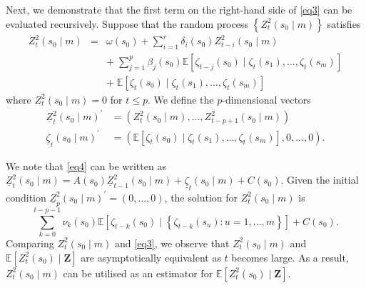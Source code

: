 \documentclass[fleqn,11pt]{article}
\begin{document}
Next, we demonstrate that the first term on the right-hand side of \eqref{eq3} can be evaluated recursively. Suppose that the random process $\left\{Z_t^2\left(s_0 \mid m\right)\right\}$ satisfies
\begin{eqnarray}\label{eq4}
Z_t^2\left(s_0 \mid m\right) & = & \omega(s_0) + \sum_{i=1}^r \delta_i(s_0) Z_{t-i}^2(s_0 \mid m) \\
&& + \; \sum_{j=1}^p \beta_j(s_0) \mathbb{E}\left[\zeta_{t-j} \left(s_0\right) \mid \zeta_t\left(s_1\right), \ldots, \zeta_t\left(s_m\right)\right] \nonumber   \\
&& + \; \mathbb{E}\left[\zeta_t\left(s_0\right) \mid \zeta_t\left(s_1\right), \ldots, \zeta_t\left(s_m\right)\right] \nonumber  
\end{eqnarray}
where $Z_t^2\left(s_0 \mid m\right)=0$ for $t \leq p$. We define the $p$-dimensional vectors
$$
\begin{aligned}
\underline{Z}_t^2\left(s_0 \mid m\right)^{\prime} & =\left(Z_t^2\left(s_0 \mid m\right), \ldots, Z_{t-p+1}^2\left(s_0 \mid m\right)\right) \\
\underline{\zeta}_t\left(s_0 \mid m\right)^{\prime} & =\left( \mathbb{E}\left[\zeta_t\left(s_0\right) \mid \zeta_t\left(s_1\right), \ldots, \zeta_t\left(s_m\right)\right], 0, \ldots, 0\right) .
\end{aligned}
$$

We note  that \eqref{eq4} can be written as $\underline{Z}_t^2\left(s_0 \mid m\right)=A\left(s_0\right) \underline{Z}_{t-1}^2\left(s_0 \mid m\right)+\underline{\zeta}_t\left(s_0 \mid m\right) + C(s_0) $. Given the initial condition $\underline{Z}_p^2\left(s_0 \mid m\right)^{\prime}=(0, \ldots, 0)$, the solution for $Z_t^2\left(s_0 \mid m\right)$ is
\begin{equation}
    \sum_{k=0}^{t-p-1} \nu_k\left(s_0\right) \mathbb{E}\left[\zeta_{t-k}\left(s_0\right) \mid\left\{\zeta_{t-k}\left(s_u\right): u=1, \ldots, m\right\}\right]+  C(s_0).
\end{equation}
Comparing $Z_t^2\left(s_0 \mid m\right)$ and \eqref{eq3}, we observe that $Z_t^2\left(s_0 \mid m\right)$ and $\mathbb{E}\left[Z_t^2\left(s_0\right) \mid \mathbf{Z}\right]$ are asymptotically equivalent as $t$ becomes large. As a result, $Z_t^2\left(s_0 \mid m\right)$ can be utilised as an estimator for $\mathbb{E}\left[Z_t^2\left(s_0\right) \mid \mathbf{Z}\right]$.
\end{document}
